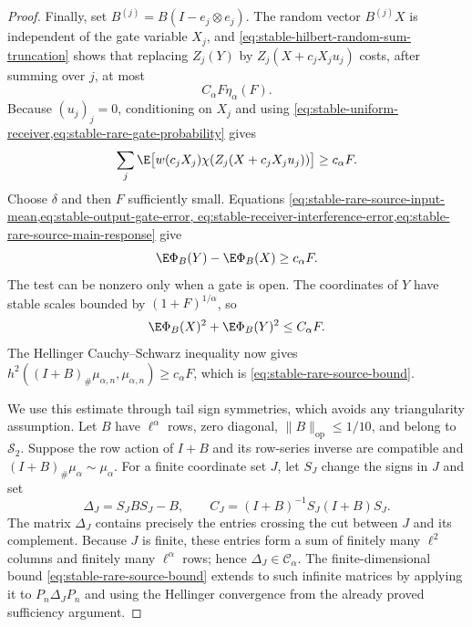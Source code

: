 \begin{proof}
Finally, set \(B^{(j)}=B(I-e_j\otimes e_j)\).
The random vector \(B^{(j)}X\) is independent of the gate variable \(X_j\),
and \eqref{eq:stable-hilbert-random-sum-truncation} shows that replacing
\(Z_j(Y)\) by \(Z_j(X+c_jX_ju_j)\) costs, after summing over \(j\), at most
\begin{equation}
 C_\alpha F\eta_\alpha(F).
 \label{eq:stable-receiver-interference-error}
\end{equation}
Because \((u_j)_j=0\), conditioning on \(X_j\) and using
\eqref{eq:stable-uniform-receiver,eq:stable-rare-gate-probability} gives
\begin{equation}
 \sum_j\E\bigl[
   w(c_jX_j)\chi(Z_j(X+c_jX_ju_j))\bigr]
 \ge c_\alpha F.
 \label{eq:stable-rare-source-main-response}
\end{equation}
Choose \(\delta\) and then \(F\) sufficiently small.
Equations
\eqref{eq:stable-rare-source-input-mean,eq:stable-output-gate-error,
eq:stable-receiver-interference-error,eq:stable-rare-source-main-response}
give
\[
 \E\Phi_B(Y)-\E\Phi_B(X)\ge c_\alpha F.
\]
The test can be nonzero only when a gate is open.
The coordinates of \(Y\) have stable scales bounded by
\((1+F)^{1/\alpha}\), so
\[
 \E\Phi_B(X)^2+\E\Phi_B(Y)^2\le C_\alpha F.
\]
The Hellinger Cauchy--Schwarz inequality now gives
\(h^2((I+B)_\#\mu_{\alpha,n},\mu_{\alpha,n})\ge c_\alpha F\),
which is \eqref{eq:stable-rare-source-bound}.

We use this estimate through tail sign symmetries, which avoids any
triangularity assumption.
Let \(B\) have \(\ell^\alpha\) rows, zero diagonal,
\(\|B\|_{\mathrm{op}}\le1/10\), and belong to \(\mathcal S_2\).  Suppose
the row action of \(I+B\) and its row-series inverse are compatible and
\((I+B)_\#\mu_\alpha\sim\mu_\alpha\).
For a finite coordinate set \(J\), let \(S_J\) change the signs in \(J\)
and set
\[
 \Delta_J=S_JBS_J-B,
 \qquad
 C_J=(I+B)^{-1}S_J(I+B)S_J.
\]
The matrix \(\Delta_J\) contains precisely the entries crossing the cut
between \(J\) and its complement.
Because \(J\) is finite, these entries form a sum of finitely many
\(\ell^2\) columns and finitely many \(\ell^\alpha\) rows; hence
\(\Delta_J\in\mathcal C_\alpha\).
The finite-dimensional bound
\eqref{eq:stable-rare-source-bound} extends to such infinite matrices by
applying it to \(P_n\Delta_JP_n\) and using the Hellinger convergence from
the already proved sufficiency argument.


\end{proof}
